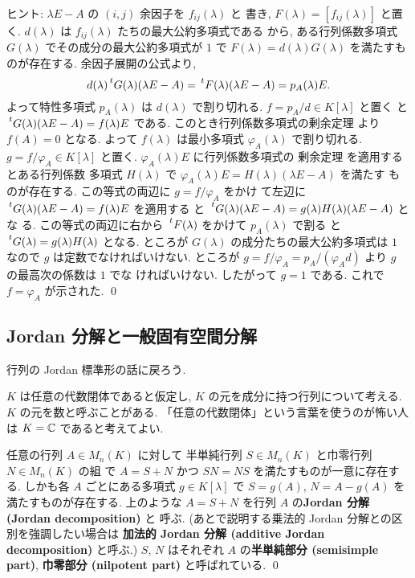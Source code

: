 \documentclass[12pt,twoside]{jarticle}
\begin{document}
\medskip
\noindent
ヒント: $\lambda E - A$ の $(i,j)$ 余因子を $f_{ij}(\lambda)$ と
書き, $F(\lambda) = [f_{ij}(\lambda)]$ と置く.  
$d(\lambda)$ は $f_{ij}(\lambda)$ たちの最大公約多項式である
から, ある行列係数多項式 $G(\lambda)$ でその成分の最大公約多項式が $1$ 
で $F(\lambda) = d(\lambda)G(\lambda)$ を満たすものが存在する. 
余因子展開の公式より,
\begin{equation*}
  d(\lambda)\tp{G(\lambda)}(\lambda E - A)
  = \tp{F(\lambda)}(\lambda E - A)
  = p_A(\lambda) E.
\end{equation*}
よって特性多項式 $p_A(\lambda)$ は $d(\lambda)$ で割り切れる.
$f=p_A/d\in K[\lambda]$ と置く
と $\tp{G(\lambda)}(\lambda E - A) = f(\lambda)E$ である.
このとき行列係数多項式の剰余定理  
より $f(A)=0$ となる.  よって $f(\lambda)$ は最小多項式 $\varphi_A(\lambda)$ 
で割り切れる.  $g=f/\varphi_A\in K[\lambda]$ と置く.
$\varphi_A(\lambda)E$ に行列係数多項式の
剰余定理  を適用するとある行列係数
多項式 $H(\lambda)$ で $\varphi_A(\lambda)E=H(\lambda)(\lambda E - A)$ を満たす
ものが存在する.  この等式の両辺に $g=f/\varphi_A$ をかけ
て左辺に $\tp{G(\lambda)}(\lambda E - A) = f(\lambda)E$ を適用する
と $\tp{G(\lambda)}(\lambda E - A)=g(\lambda)H(\lambda)(\lambda E - A)$ とな
る.  この等式の両辺に右から $\tp{F(\lambda)}$ をかけて $p_A(\lambda)$ で割る
と $\tp{G(\lambda)} = g(\lambda)H(\lambda)$ となる.  ところが $G(\lambda)$ 
の成分たちの最大公約多項式は $1$ なので $g$ は定数でなければいけない.
ところが $g=f/\varphi_A=p_A/(\varphi_A d)$ より $g$ の最高次の係数は $1$ でな
ければいけない. したがって $g=1$ である.  これで $f=\varphi_A$ が示された.
\qed


\subsection{Jordan 分解と一般固有空間分解}
\label{sec:Jordan-decomposition}

行列の Jordan 標準形の話に戻ろう. 

$K$ は任意の代数閉体であると仮定し, $K$ の元を成分に持つ行列について考える.
$K$ の元を数と呼ぶことがある. 「任意の代数閉体」という言葉を使うのが怖い人
は $K={\mathbb C}$ であると考えてよい.

\begin{theorem}[Jordan 分解]
  任意の行列 $A\in M_n(K)$ に対して
  半単純行列 $S\in M_n(K)$ と巾零行列 $N\in M_n(K)$ の組
  で $A=S+N$ かつ $SN = NS$ を満たすものが一意に存在する. 
  しかも各 $A$ ごとにある多項式 $g\in K[\lambda]$ 
  で $S = g(A)$, $N = A - g(A)$ を満たすものが存在する.  
  上のような $A=S+N$ を行列 $A$ の{\bf Jordan 分解 (Jordan decomposition)} と
  呼ぶ.  (あとで説明する乗法的 Jordan 分解との区別を強調したい場合は
  {\bf 加法的 Jordan 分解 (additive Jordan decomposition)} と呼ぶ.)
  $S$, $N$ はそれぞれ $A$ の{\bf 半単純部分 (semisimple part)}, 
  {\bf 巾零部分 (nilpotent part)} と呼ばれている.
  \qed  
\end{theorem}
\end{document}
